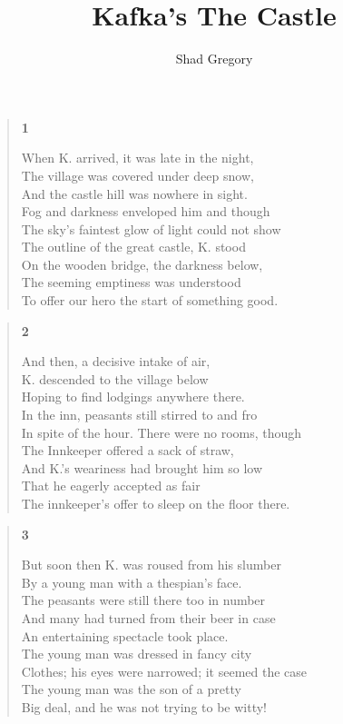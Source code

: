 \documentclass{article}
\title{Kafka's The Castle}
\author{Shad Gregory}
\date{}
\begin{document}
\maketitle
\begin{verse}
  \begin{center}
    \textbf{1} \\
  \end{center}
  When K. arrived, it was late in the night, \\
  The village was covered under deep snow, \\
  And the castle hill was nowhere in sight. \\
  Fog and darkness enveloped him and though \\
  The sky's faintest glow of light could not show \\
  The outline of the great castle, K. stood \\
  On the wooden bridge, the darkness below, \\
  The seeming emptiness was understood \\
  To offer our hero the start of something good.
\end{verse}
\begin{verse}
  \begin{center}
    \textbf{2} \\
  \end{center}
  And then, a decisive intake of air, \\
  K. descended to the village below \\
  Hoping to find lodgings anywhere there. \\
  In the inn, peasants still stirred to and fro \\
  In spite of the hour. There were no rooms, though \\
  The Innkeeper offered a sack of straw, \\
  And K.'s weariness had brought him so low \\
  That he eagerly accepted as fair \\
  The innkeeper's offer to sleep on the floor there. \\
\end{verse}
\begin{verse}
  \begin{center}
    \textbf{3} \\
  \end{center}
  But soon then K. was roused from his slumber \\
  By a young man with a thespian's face. \\
  The peasants were still there too in number \\
  And many had turned from their beer in case \\
  An entertaining spectacle took place. \\
  The young man was dressed in fancy city \\
  Clothes; his eyes were narrowed; it seemed the case \\
  The young man was the son of a pretty \\
  Big deal, and he was not trying to be witty!
\end{verse}
\end{document}
